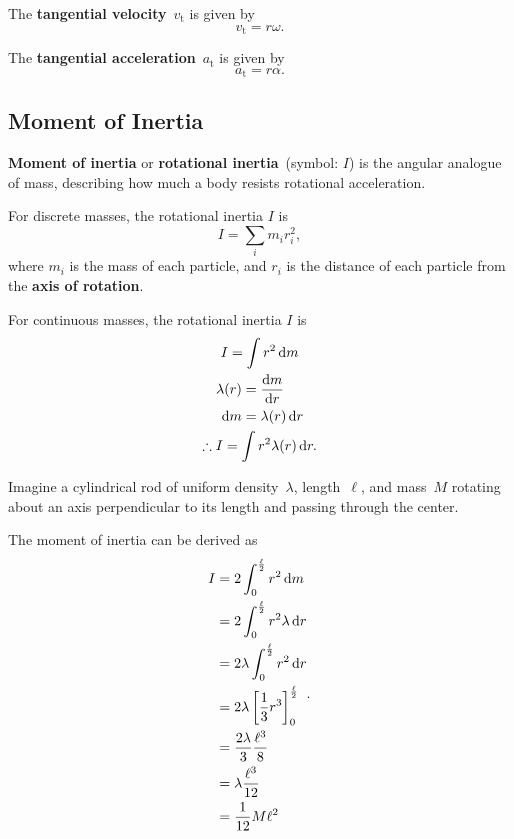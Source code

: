 The \textbf{tangential velocity}~\(v_\mathrm{t}\) is given by
\begin{equation}
    v_\mathrm{t} = r \omega.
\end{equation}

The \textbf{tangential acceleration}~\(a_\mathrm{t}\) is given by
\begin{equation}
    a_\mathrm{t} = r \alpha.
\end{equation}

\subsection{Moment of Inertia}

\textbf{Moment of inertia} or \textbf{rotational inertia}~(symbol: \(I\)) is
the angular analogue of mass,
describing how much a body resists rotational acceleration.

For discrete masses, the rotational inertia \(I\) is
\begin{equation}
    I = \sum_i m_i r_i^2,
\end{equation}
where \(m_i\) is the mass of each particle,
and \(r_i\) is the distance of each particle from the \textbf{axis of rotation}.

For continuous masses, the rotational inertia \(I\) is
\begin{gather}
    I = \int r^2 \odif{m} \\
    \begin{aligned}
        \lambda(r) &= \odv{m}{r} \\
        \odif{m} &= \lambda(r) \odif{r}
    \end{aligned} \\
    \therefore I = \int r^2 \lambda(r) \odif{r}.
\end{gather}

Imagine a cylindrical rod of uniform density~\(\lambda\),
length~\(\ell\), and mass~\(M\)
rotating about an axis perpendicular to its length and passing
through the center.

\begin{figure}[ht]
    \centering
    
\end{figure}

The moment of inertia can be derived as
\begin{equation} \label{eq:uniform-rod-rotational-inertia}
    \begin{aligned}
        I &= 2 \int_{0}^{\frac{\ell}{2}} r^2 \odif{m} \\
        &= 2 \int_{0}^{\frac{\ell}{2}} r^2 \lambda \odif{r} \\
        &= 2 \lambda \int_{0}^{\frac{\ell}{2}} r^2 \odif{r} \\
        &= 2 \lambda \left[\frac{1}{3} r^3 \right]^\frac{\ell}{2}_0 \\
        &= \frac{2 \lambda}{3} \frac{\ell^3}{8} \\
        &= \lambda \frac{\ell^3}{12} \\
        &= \frac{1}{12} M \ell^2
    \end{aligned}.
\end{equation}

